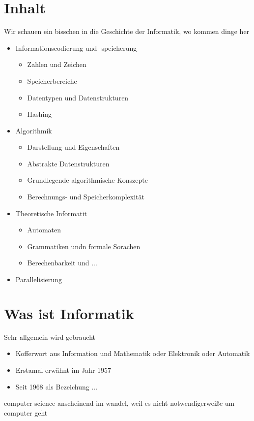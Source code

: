 \documentclass{gadsescript}
\begin{document}
\section{Inhalt}
Wir schauen ein bisschen in die Geschichte der Informatik, wo kommen dinge her
\begin{itemize}
	\item Informationscodierung und -speicherung
		\begin{itemize}
			\item Zahlen und Zeichen
			\item Speicherbereiche
			\item Datentypen und Datenstrukturen
			\item Hashing
		\end{itemize}
	\item Algorithmik
		\begin{itemize}
			\item Darstellung und Eigenschaften
			\item Abstrakte Datenstrukturen
			\item Grundlegende algorithmische Konszepte
			\item Berechnungs- und Speicherkomplexität
		\end{itemize}
	\item Theoretische Informatit
		\begin{itemize}
			\item Automaten
			\item Grammatiken undn formale Sorachen
			\item Berechenbarkeit und ...
		\end{itemize}
	\item Parallelisierung
\end{itemize}

\section{Was ist Informatik}
Sehr allgemein wird gebraucht

\begin{itemize}
	\item Kofferwort aus Information und Mathematik oder Elektronik oder Automatik
	\item Erstamal erwähnt im Jahr 1957
	\item Seit 1968 als Bezeichung ...
\end{itemize}
computer science anscheinend im wandel, weil es nicht notwendigerweiße um computer geht
\end{document}

